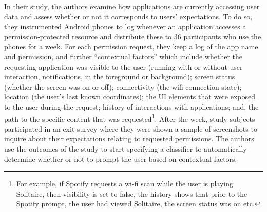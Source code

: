 \documentclass[../thesis.tex]{subfiles}
\begin{document}
In their study, the authors examine how applications are currently
accessing user data and assess whether or not it corresponds to
users' expectations. To do so, they instrumented
Android phones to log whenever an application accesses a
permission-protected resource and distribute these to 36 participants
who use the phones for a week. For each permission request, they keep a
log of the app name and permission, and further
``contextual factors'' which include
whether the requesting application was visible to the user (running
with or without user interaction, notifications, in the foreground or
background); screen status (whether the screen was on or off);
connectivity (the wifi connection state); location (the
user's last known coordinates); the UI elements that
were exposed to the user during the request; history of interactions
with applications; and, the path to the specific content that was
requested\footnote{For example, if Spotify requests a wi-fi scan while
the user is playing Solitaire, then visibility is set to false, the
history shows that prior to the Spotify prompt, the user had viewed
Solitaire, the screen status was on etc.}. After the week, study
subjects participated in an exit survey where they were shown a sample
of screenshots to inquire about their expectations relating to
requested permissions. The authors use the outcomes of the study to
start specifying a classifier to automatically determine whether or not
to prompt the user based on contextual factors.
\end{document}
